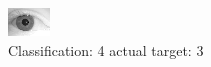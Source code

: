 \begin{figure}[h!]
\begin{center}
\includegraphics[width=0.60\columnwidth]{figures/ID2092_class_4_target_3.png}
\end{center}
\caption{ Classification: 4 actual target: 3}
\label{fig:ID2092_class_4_target_3}
\end{figure}
